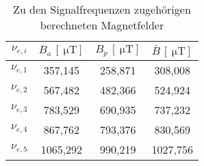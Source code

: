 \begin{table}[H]
  \centering
\begin{tabular}{c|ccc}
  \toprule
$\nu_{e, i}$ & $B_a \, [\SI{}{\micro\tesla}]$ &
$B_p \, [\SI{}{\micro\tesla}]$ & $\bar{B} \, [\SI{}{\micro\tesla}]$ \\
 \midrule
  $\nu_{e, 1}$ & 357,145 & 258,871 & 308,008    \\
  $\nu_{e, 2}$ & 567,482 & 482,366 & 524,924    \\
  $\nu_{e, 3}$ & 783,529 & 690,935 & 737,232    \\
  $\nu_{e, 4}$ & 867,762 & 793,376 & 830,569   \\
  $\nu_{e, 5}$ & 1065,292 & 990,219 & 1027,756  \\
\bottomrule
\end{tabular}
\caption{Zu den Signalfrequenzen zugehörigen berechneten Magnetfelder}
\label{tab:bfelder}
\end{table}
